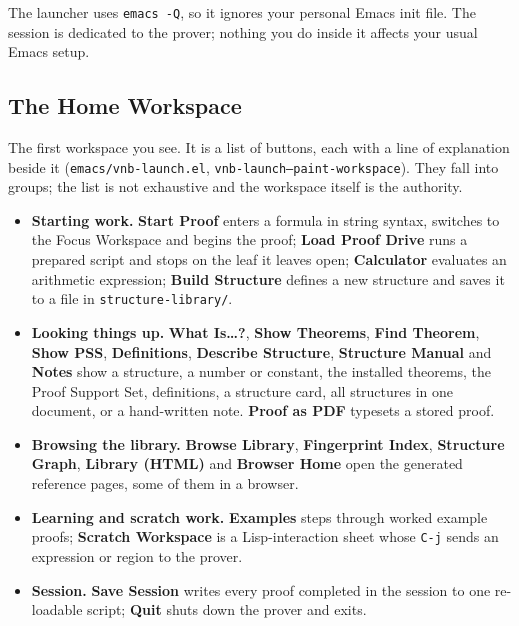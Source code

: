 \begin{remark}
The launcher uses \texttt{emacs -Q}, so it ignores your personal
Emacs init file.  The session is dedicated to the prover; nothing
you do inside it affects your usual Emacs setup.
\end{remark}

\subsection{The Home Workspace}

The first workspace you see.  It is a list of buttons, each with a line of
explanation beside it (\texttt{emacs/vnb-launch.el}, \texttt{vnb-launch--paint-workspace}).
They fall into groups; the list is not exhaustive and the workspace itself is
the authority.

\begin{itemize}
\item \textbf{Starting work.}  \textbf{Start Proof} enters a formula in string
  syntax, switches to the Focus Workspace and begins the proof;
  \textbf{Load Proof Drive} runs a prepared script and stops on the leaf it
  leaves open; \textbf{Calculator} evaluates an arithmetic expression;
  \textbf{Build Structure} defines a new structure and saves it to a file in
  \texttt{structure-library/}.
\item \textbf{Looking things up.}  \textbf{What Is\ldots?}, \textbf{Show Theorems},
  \textbf{Find Theorem}, \textbf{Show PSS}, \textbf{Definitions},
  \textbf{Describe Structure}, \textbf{Structure Manual} and
  \textbf{Notes} show a structure, a number or constant, the installed
  theorems, the Proof Support Set, definitions, a structure card, all
  structures in one document, or a hand-written note.  \textbf{Proof as PDF}
  typesets a stored proof.
\item \textbf{Browsing the library.}  \textbf{Browse Library},
  \textbf{Fingerprint Index}, \textbf{Structure Graph}, \textbf{Library
  (HTML)} and \textbf{Browser Home} open the generated reference pages, some
  of them in a browser.
\item \textbf{Learning and scratch work.}  \textbf{Examples} steps through
  worked example proofs; \textbf{Scratch Workspace} is a Lisp-interaction
  sheet whose \texttt{C-j} sends an expression or region to the prover.
\item \textbf{Session.}  \textbf{Save Session} writes every proof completed
  in the session to one re-loadable script; \textbf{Quit} shuts down the
  prover and exits.
\end{itemize}

